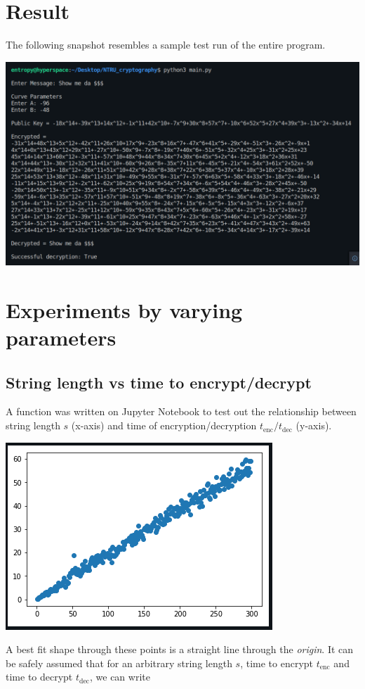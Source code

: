 \documentclass[cryptography,article,submit,moreauthors,pdftex]{Definitions/mdpi}
\begin{document}
\section{Result}
\begin{flushleft}
    The following snapshot resembles a sample test run of the entire program.
    \begin{center}
        \includegraphics[scale=0.35]{images/Test Run.png}
    \end{center}
\end{flushleft}

\section{Experiments by varying parameters}
\subsection{String length vs time to encrypt/decrypt}
\begin{flushleft}
A function was written on Jupyter Notebook to test out the relationship between string length $s$ (x-axis) and time of encryption/decryption $t_{\text{enc}}/t_{\text{dec}}$ (y-axis).
\begin{center}
	\includegraphics[scale=0.75]{images/strlen vs time.png}
\end{center}

A best fit shape through these points is a straight line through the \textit{origin}. It can be safely assumed that for an arbitrary string length $s$, time to encrypt $t_{\text{enc}}$ and time to decrypt $t_{\text{dec}}$, we can write
\end{flushleft}
\end{document}
